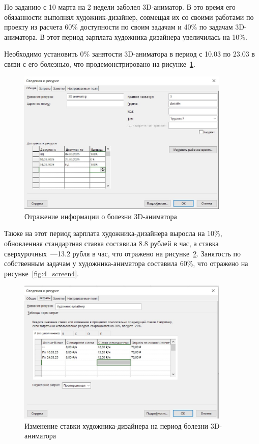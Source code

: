 По заданию с 10 марта на 2 недели заболел 3D-аниматор.
В это время его обязанности выполнял художник-дизайнер, совмещая их со своими работами по проекту из расчета 60\% доступности по своим задачам и 40\% по задачам 3D-аниматора.
В этот период зарплата художника-дизайнера увеличилась на 10\%.

Необходимо установить 0\% занятости 3D-аниматора в период с 10.03 по 23.03 в связи с его болезнью, что продемонстрировано на рисунке~\ref{fig:4_screen2}. 

\begin{figure}[H]
	\centering
	\includegraphics[width=0.9\textwidth]{img/lab4/screen2.jpg}
	\caption{Отражение информации о болезни 3D-аниматора}
	\label{fig:4_screen2}
\end{figure}

Также на этот период зарплата художника-дизайнера выросла на 10\%, обновленная стандартная ставка составила 8.8 рублей в час, а ставка сверхурочных~---13.2 рубля в час, что отражено на рисунке~\ref{fig:4_screen3}.
Занятость по собственным задачам у художника-аниматора составила 60\%, что отражено на рисунке~\ref{fig:4_screen4}.

\begin{figure}[H]
	\centering
	\includegraphics[width=0.9\textwidth]{img/lab4/screen3.jpg}
	\caption{Изменение ставки художника-дизайнера на период болезни 3D-аниматора}
	\label{fig:4_screen3}
\end{figure}

